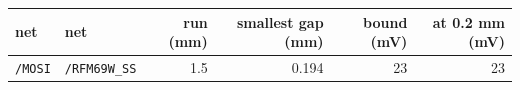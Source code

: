 \begin{tabular}{llrrrr}
\toprule
net & net & run (mm) & smallest gap (mm) & bound (mV) & at 0.2 mm (mV) \\
\midrule
\texttt{/MOSI} & \texttt{/RFM69W\_SS} & 1.5 & 0.194 & 23 & 23 \\
\bottomrule
\end{tabular}
